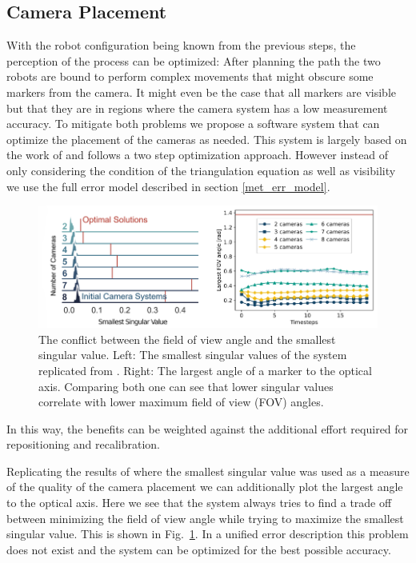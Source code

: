 \documentclass[5p,times,procedia]{elsarticle}
\begin{document}
\subsection{Camera Placement}
With the robot configuration being known from the previous steps, the perception of the process can be optimized:
After planning the path the two robots are bound to perform complex movements that might obscure some markers from the camera.
It might even be the case that all markers are visible but that they are in regions where the camera system has a low measurement accuracy.
To mitigate both problems we propose a software system that can optimize the placement of the cameras as needed.
This system is largely based on the work of \cite{camera_placement} and follows a two step optimization approach.
However instead of only considering the condition of the triangulation equation as well as visibility we use the full error model described in section \ref{met_err_model}.\\
\begin{figure}[!htb]
	\centering
	\includegraphics[width=0.95\columnwidth]{graphics/fov_sv_conflict.png}
	\caption{The conflict between the field of view angle and the smallest singular value. Left: The smallest singular values of the system replicated from \cite{camera_placement}. Right: The largest angle of a marker to the optical axis.
		Comparing both one can see that lower singular values correlate with lower maximum field of view (FOV) angles.}
	\label{fig:fov_sv_conflict}
\end{figure}
In this way, the benefits can be weighted against the additional effort required  for repositioning and recalibration.

%
Replicating the results of \cite{camera_placement} where the smallest singular value was used as a measure of the quality of the camera placement we can additionally plot the largest angle to the optical axis.
Here we see that the system always tries to find a trade off between minimizing the field of view angle while trying to maximize the smallest singular value.
This is shown in Fig.~\ref{fig:fov_sv_conflict}.
In a unified error description this problem does not exist and the system can be optimized for the best possible accuracy.
%
%
\end{document}
